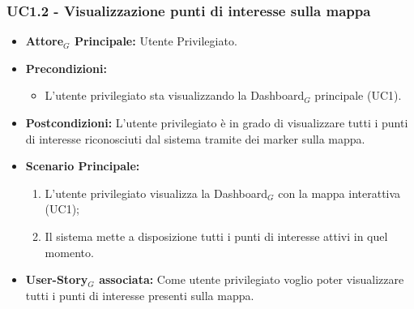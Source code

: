 \documentclass[11pt]{article}
\begin{document}
\begin{justify}
\subsubsection{\textbf{UC1.2 - Visualizzazione punti di interesse sulla mappa}}
\label{UC1.2}
\begin{itemize}
     \item \textbf{Attore$_G$ Principale:} Utente Privilegiato.
     \item \textbf{Precondizioni:}
        \begin{itemize}
    		\item L'utente privilegiato sta visualizzando la Dashboard$_G$ principale (UC1).
        \end{itemize}
     \item \textbf{Postcondizioni:} L'utente privilegiato è in grado di visualizzare tutti i punti di interesse riconosciuti dal sistema tramite dei marker sulla mappa.
     \item \textbf{Scenario Principale:}
        \begin{enumerate}
            \item L'utente privilegiato visualizza la Dashboard$_G$ con la mappa interattiva (UC1);
            \item Il sistema mette a disposizione tutti i punti di interesse attivi in quel momento.
        \end{enumerate}
     \item \textbf{User-Story$_G$ associata:}
     Come utente privilegiato voglio poter visualizzare tutti i punti di interesse presenti sulla mappa.
\end{itemize}

\end{justify}
\end{document}
